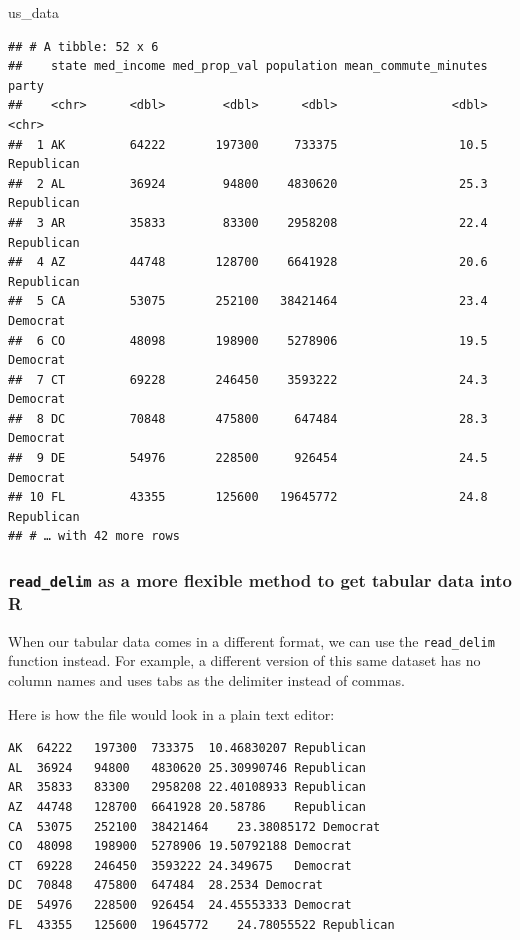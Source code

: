 \documentclass[
]{article}
\newenvironment{Shaded}{\begin{snugshade}}{\end{snugshade}}
\newcommand{\NormalTok}[1]{#1}
\begin{document}
\begin{Shaded}
\begin{Highlighting}[]
\NormalTok{us\_data}
\end{Highlighting}
\end{Shaded}

\begin{verbatim}
## # A tibble: 52 x 6
##    state med_income med_prop_val population mean_commute_minutes party     
##    <chr>      <dbl>        <dbl>      <dbl>                <dbl> <chr>     
##  1 AK         64222       197300     733375                 10.5 Republican
##  2 AL         36924        94800    4830620                 25.3 Republican
##  3 AR         35833        83300    2958208                 22.4 Republican
##  4 AZ         44748       128700    6641928                 20.6 Republican
##  5 CA         53075       252100   38421464                 23.4 Democrat  
##  6 CO         48098       198900    5278906                 19.5 Democrat  
##  7 CT         69228       246450    3593222                 24.3 Democrat  
##  8 DC         70848       475800     647484                 28.3 Democrat  
##  9 DE         54976       228500     926454                 24.5 Democrat  
## 10 FL         43355       125600   19645772                 24.8 Republican
## # … with 42 more rows
\end{verbatim}

\hypertarget{read_delim-as-a-more-flexible-method-to-get-tabular-data-into-r}{%
\subsubsection{\texorpdfstring{\texttt{read\_delim} as a more flexible
method to get tabular data into
R}{read\_delim as a more flexible method to get tabular data into R}}\label{read_delim-as-a-more-flexible-method-to-get-tabular-data-into-r}}

When our tabular data comes in a different format, we can use the
\texttt{read\_delim} function instead. For example, a different version
of this same dataset has no column names and uses tabs as the delimiter
instead of commas.

Here is how the file would look in a plain text editor:

\begin{verbatim}
AK  64222   197300  733375  10.46830207 Republican
AL  36924   94800   4830620 25.30990746 Republican
AR  35833   83300   2958208 22.40108933 Republican
AZ  44748   128700  6641928 20.58786    Republican
CA  53075   252100  38421464    23.38085172 Democrat
CO  48098   198900  5278906 19.50792188 Democrat
CT  69228   246450  3593222 24.349675   Democrat
DC  70848   475800  647484  28.2534 Democrat
DE  54976   228500  926454  24.45553333 Democrat
FL  43355   125600  19645772    24.78055522 Republican
\end{verbatim}
\end{document}
